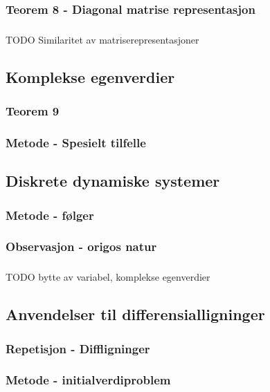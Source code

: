 \documentclass{article}
\begin{document}
      \subsubsection{Teorem 8 - Diagonal matrise representasjon}
        
      \subsubsection{}
        TODO Similaritet av matriserepresentasjoner
    \subsection{Komplekse egenverdier}
      \subsubsection{Teorem 9}
        
      \subsubsection{Metode - Spesielt tilfelle}
        
    \subsection{Diskrete dynamiske systemer}
      \subsubsection{Metode - følger}
        
      \subsubsection{Observasjon - origos natur}
        
      \subsubsection{}
        TODO bytte av variabel, komplekse egenverdier
    \subsection{Anvendelser til differensialligninger}
      \subsubsection{Repetisjon - Diffligninger}
        
      \subsubsection{Metode - initialverdiproblem}
        
\end{document}

